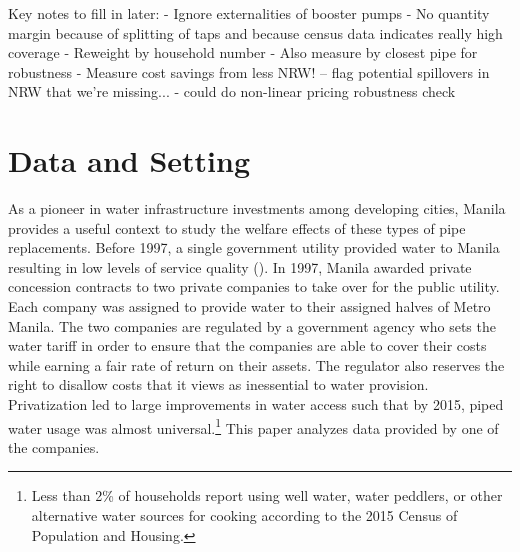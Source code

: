 \documentclass[12pt,table]{article}
\begin{document}
Key notes to fill in later:
- Ignore externalities of booster pumps
- No quantity margin because of splitting of taps and because census data indicates really high coverage
- Reweight by household number
- Also measure by closest pipe for robustness
- Measure cost savings from less NRW! 
	-- flag potential spillovers in NRW that we're missing...
- could do non-linear pricing robustness check







\section{Data and Setting}

As a pioneer in water infrastructure investments among developing cities, Manila provides a useful context to study the welfare effects of these types of pipe replacements.  Before 1997, a single government utility provided water to Manila resulting in low levels of service quality (\cite{dumol2000manila}).  In 1997, Manila awarded private concession contracts to two private companies to take over for the public utility.  Each company was assigned to provide water to their assigned halves of Metro Manila.  The two companies are regulated by a government agency who sets the water tariff in order to ensure that the companies are able to cover their costs while earning a fair rate of return on their assets.  The regulator also reserves the right to disallow costs that it views as inessential to water provision.  Privatization led to large improvements in water access such that by 2015, piped water usage was almost universal.\footnote{Less than 2\% of households report using well water, water peddlers, or other alternative water sources for cooking according to the 2015 Census of Population and Housing.}  This paper analyzes data provided by one of the companies.  
\end{document}
